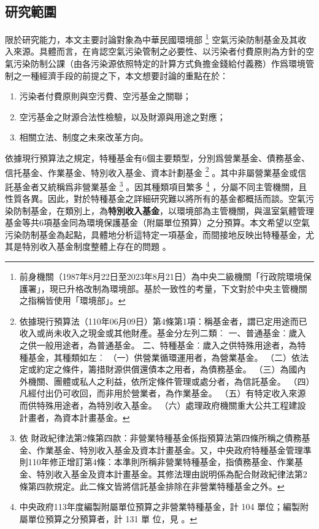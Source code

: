\documentclass[12pt,a4paper]{article}
\begin{document}
\subsection{研究範圍}

限於研究能力，本文主要討論對象為中華民國環境部
\footnote{前身機關（1987年8月22日至2023年8月21日）為中央二級機關「行政院環境保護署」，現已升格改制為環境部。基於一致性的考量，下文對於中央主管機關之指稱皆使用「環境部」。}
空氣污染防制基金及其收入來源。具體而言，在肯認空氣污染管制之必要性、以污染者付費原則為方針的空氣污染防制公課（由各污染源依照特定的計算方式負擔金錢給付義務）作爲環境管制之一種經濟手段的前提之下，本文想要討論的重點在於：
\begin{enumerate}[topsep=0.5em, partopsep=0pt, itemsep=0pt, parsep=0pt,leftmargin=3em]
  \item 污染者付費原則與空污費、空污基金之關聯；
  \item 空污基金之財源合法性檢驗，以及財源與用途之對應；
  \item 相關立法、制度之未來改革方向。
  \end{enumerate}  


依據現行預算法之規定，特種基金有6個主要類型，分別爲營業基金、債務基金、信托基金、作業基金、特別收入基金、資本計劃基金
\footnote{依據現行預算法（110年06月09日）第4條第1項：稱基金者，謂已定用途而已收入或尚未收入之現金或其他財產。基金分左列二類︰
一、普通基金︰歲入之供一般用途者，為普通基金。
二、特種基金︰歲入之供特殊用途者，為特種基金，其種類如左︰
（一）供營業循環運用者，為營業基金。
（二）依法定或約定之條件，籌措財源供償還債本之用者，為債務基金。
（三）為國內外機關、團體或私人之利益，依所定條件管理或處分者，為信託基金。
（四）凡經付出仍可收回，而非用於營業者，為作業基金。
（五）有特定收入來源而供特殊用途者，為特別收入基金。
（六）處理政府機關重大公共工程建設計畫者，為資本計畫基金。}
。其中非屬營業基金或信託基金者又統稱爲非營業基金
\footnote{依 財政紀律法第2條第四款：非營業特種基金係指預算法第四條所稱之債務基金、作業基金、特別收入基金及資本計畫基金。又，中央政府特種基金管理準則110年修正增訂第4條：本準則所稱非營業特種基金，指債務基金、作業基金、特別收入基金及資本計畫基金。其修法理由説明係為配合財政紀律法第2條第四款規定。此二條文皆將信託基金排除在非營業特種基金之外。}
。因其種類項目繁多
\footnote{中央政府113年度編製附屬單位預算之非營業特種基金，計 104 單位；編製附屬單位預算之分預算者，計 131 單
位，見
。}
，分屬不同主管機關，且性質各異。因此，對於特種基金之詳細研究難以將所有的基金都概括而談。空氣污染防制基金，在類別上，為\textbf{特別收入基金}，以環境部為主管機關，與溫室氣體管理基金等共6項基金同為環境保護基金（附屬單位預算）之分預算。本文希望以空氣污染防制基金為起點，具體地分析這特定一項基金，而間接地反映出特種基金，尤其是特別收入基金制度整體上存在的問題
。
\end{document}
